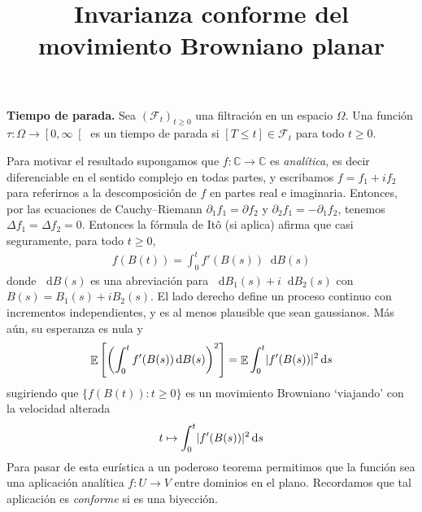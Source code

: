 \documentclass{article}
\title{Invarianza conforme del movimiento Browniano planar}
\newcommand{\ito}{Itô}
\newcommand{\events}{\mathcal{F}}
\newcommand{\dd}{\mathop{}\!\mathrm{d}}
\newcommand{\complexNumbers}{\mathbb{C}}
\DeclareMathOperator{\Expectation}{\mathbb{E}}
\DeclarePairedDelimiter{\abs}{\lvert}{\rvert}
\theoremstyle{plain}
\theoremstyle{remark}
\begin{document}
\maketitle

\textbf{Tiempo de parada.}
Sea \((\events_t)_{t \geq 0}\) una filtración en un espacio \(\Omega\).
Una función \(\tau : \Omega \rightarrow \left[ 0, \infty \right[\) es un tiempo de parada si \([T \leq t] \in \events_t\) para todo \(t \geq 0\).





\newpage

Para motivar el resultado supongamos que \(f : \complexNumbers \rightarrow \complexNumbers\) es \emph{analítica}, es decir diferenciable en el sentido complejo en todas partes, y escribamos \(f = f_1 + i f_2\) para referirnos a la descomposición de \(f\) en partes real e imaginaria.
Entonces, por las ecuaciones de Cauchy--Riemann \(\partial_1 f_1 = \partial f_2\) y \(\partial_2 f_1 = - \partial_1 f_2\), tenemos \(\Delta f_1 = \Delta f_2 = 0\).
Entonces la fórmula de \ito{} (si aplica) afirma que casi seguramente, para todo \(t \geq 0\),
\begin{align}
  f(B(t))
  =
  \int_0^t f'(B(s)) \dd B(s)
\end{align}
donde \(\dd B(s)\) es una abreviación para \(\dd B_1(s) + i \dd B_2(s)\) con \(B(s) = B_1(s) + i B_2(s)\).
El lado derecho define un proceso continuo con incrementos independientes, y es al menos plausible que sean gaussianos.
Más aún, su esperanza es nula y
\begin{align}
  \Expectation \left[ \left( \int_0^t f'(B(s)) \dd B(s) \right)^2 \right]
  =
  \Expectation \int_0^t \abs{f'(B(s))}^2 \dd s
\end{align}
sugiriendo que \(\{f(B(t)) : t \geq 0\}\) es un movimiento Browniano `viajando' con la velocidad alterada
\begin{align}
  t
  \mapsto
  \int_0^t \abs{f'(B(s))}^2 \dd s
\end{align}
Para pasar de esta eurística a un poderoso teorema permitimos que la función sea una aplicación analítica \(f : U \rightarrow V\) entre dominios en el plano.
Recordamos que tal aplicación es \emph{conforme} si es una biyección.
\end{document}

